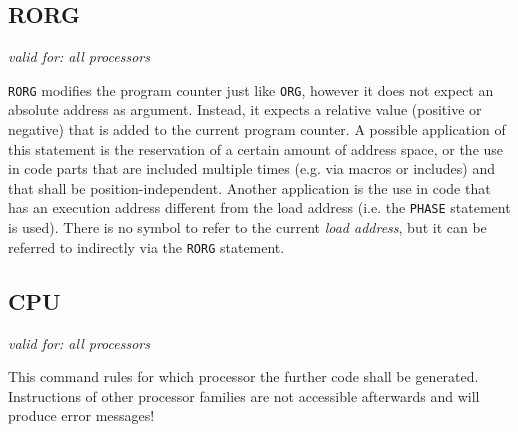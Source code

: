 \documentclass[12pt,twoside]{report}
\makeatletter
\newcommand{\tty}[1]{{\tt #1}}
\newcommand{\ttindex}[1]{\index{#1@{\tt #1}}}
\makeatother
\begin{document}

\subsection{RORG}
\label{SectRORG}
\ttindex{RORG}

{\em valid for: all processors}

\tty{RORG} modifies the program counter just like \tty{ORG},
however it does not expect an absolute address as argument.
Instead, it expects a relative value (positive or negative) that
is added to the current program counter.  A possible application
of this statement is the reservation of a certain amount of
address space, or the use in code parts that are included
multiple times (e.g. via macros or includes) and that shall be
position-independent.  Another application is the use in code
that has an execution address different from the load address
(i.e. the \tty{PHASE} statement is used).  There is no symbol to
refer to the current {\em load address}, but it can be referred
to indirectly via the \tty{RORG} statement.


\subsection{CPU}
\label{SectCPU}
\ttindex{CPU}


\newcommand{\cpu}{
 \stepcounter{cpucounter1}
 \ifnum\value{cpucounter1}>26
   \setcounter{cpucounter1}{1}
   \stepcounter{cpucounter2}
 \fi
 \ifnum\value{cpucounter2}>0\alph{cpucounter2}\fi\alph{cpucounter1})
}
\newenvironment{cpulist}
{
 \begin{quote}
 \begin{tabbing}
 \cpu \=
 }
{
 \end{tabbing}
 \end{quote}
}

{\em valid for: all processors}

This command rules for which processor the further code shall be
generated.  Instructions of other processor families are not
accessible afterwards and will produce error messages!
\end{document}
